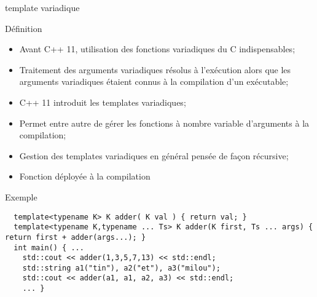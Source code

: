\documentclass[compress,10pt,aspectratio=169]{beamer}
\begin{document}
  \begin{frame}[fragile]{template variadique}
  \scriptsize\vspace*{-3mm}
  \begin{block}{\small Définition}
  \begin{itemize}
  \item Avant C++ 11, utilisation des fonctions variadiques du C indispensables;
  \item Traitement des arguments variadiques résolus à l'exécution alors que les 
        arguments variadiques étaient connus à la compilation d'un exécutable;
  \item C++ 11 introduit les templates variadiques;
  \item Permet entre autre de gérer les fonctions à nombre variable d'arguments à 
        la compilation;
  \item Gestion des templates variadiques en général pensée de façon récursive;
  \item Fonction déployée à la compilation
  \end{itemize}
  \end{block}
  \vspace*{-4mm}
  \begin{exampleblock}{\small Exemple}
  \begin{verbatim}
  template<typename K> K adder( K val ) { return val; }
  template<typename K,typename ... Ts> K adder(K first, Ts ... args) { return first + adder(args...); }
  int main() { ...
    std::cout << adder(1,3,5,7,13) << std::endl;
    std::string a1("tin"), a2("et"), a3("milou");
    std::cout << adder(a1, a1, a2, a3) << std::endl;
    ... }
  \end{verbatim}
  \end{exampleblock}
  \end{frame}
  
\end{document}
